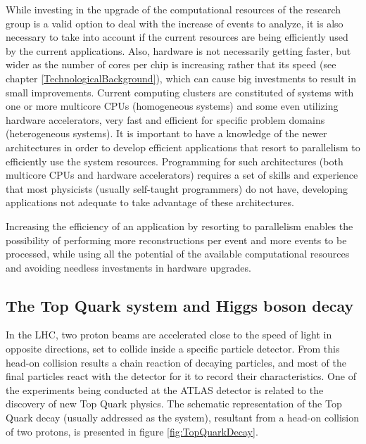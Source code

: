 While investing in the upgrade of the computational resources of the research group is a valid option to deal with the increase of events to analyze, it is also necessary to take into account if the current resources are being efficiently used by the current applications. Also, hardware is not necessarily getting faster, but wider as the number of cores per chip is increasing rather that its speed (see chapter \ref{TechnologicalBackground}), which can cause big investments to result in small improvements. Current computing clusters are constituted of systems with one or more multicore CPUs (homogeneous systems) and some even utilizing hardware accelerators, very fast and efficient for specific problem domains (heterogeneous systems). It is important to have a knowledge of the newer architectures in order to develop efficient applications that resort to parallelism to efficiently use the system resources. Programming for such architectures (both multicore CPUs and hardware accelerators) requires a set of skills and experience that most physicists (usually self-taught programmers) do not have, developing applications not adequate to take advantage of these architectures.

Increasing the efficiency of an application by resorting to parallelism enables the possibility of performing more reconstructions per event and more events to be processed, while using all the potential of the available computational resources and avoiding needless investments in hardware upgrades.

\subsection{The Top Quark system and Higgs boson decay}
\label{TopQuarkSystem}

In the LHC, two proton beams are accelerated close to the speed of light in opposite directions, set to collide inside a specific particle detector. From this head-on collision results a chain reaction of decaying particles, and most of the final particles react with the detector for it to record their characteristics. One of the experiments being conducted at the ATLAS detector is related to the discovery of new Top Quark physics. The schematic representation of the Top Quark decay (usually addressed as the \ttbar system), resultant from a head-on collision of two protons, is presented in figure \ref{fig:TopQuarkDecay}.

